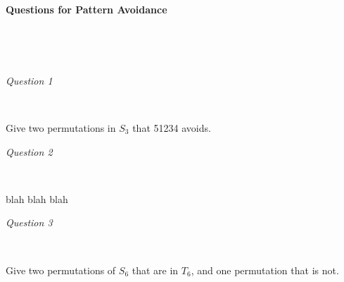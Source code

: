 \documentclass{article}
\begin{document}
\begin{center}
{\bf\Large {Questions for Pattern Avoidance}}
\end{center}


\

\


\emph{Question 1}

\


Give two permutations in $S_3$ that 51234 avoids. 

\vspace{4cm}


\emph{Question 2}

\
 
blah blah blah

\vspace{4cm}



\emph{Question 3}

\

Give two permutations of $S_6$ that are in $T_6$, and one permutation that is not.
\end{document}

